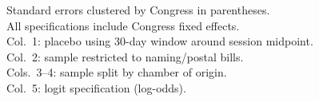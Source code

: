 \begin{table}[htbp]
   \par \raggedright
   Standard errors clustered by Congress in parentheses.\\
   All specifications include Congress fixed effects.\\
   Col.~1: placebo using 30-day window around session midpoint.\\
   Col.~2: sample restricted to naming/postal bills.\\
   Cols.~3--4: sample split by chamber of origin.\\
   Col.~5: logit specification (log-odds).
\end{table}


